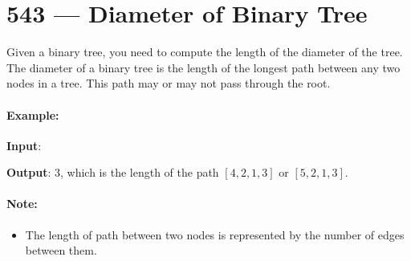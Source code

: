 \section{543 --- Diameter of Binary Tree}
Given a binary tree, you need to compute the length of the diameter of the tree. The diameter of a binary tree is the length of the longest path between any two nodes in a tree. This path may or may not pass through the root.

\paragraph{Example:}
\begin{flushleft}
\textbf{Input}:

\begin{figure}[H]
\end{figure}

\textbf{Output}: 3, which is the length of the path $[4,2,1,3]$ or $[5,2,1,3]$.
\end{flushleft}
\paragraph{Note:} 
\begin{itemize}
\item The length of path between two nodes is represented by the number of edges between them. 
\end{itemize}